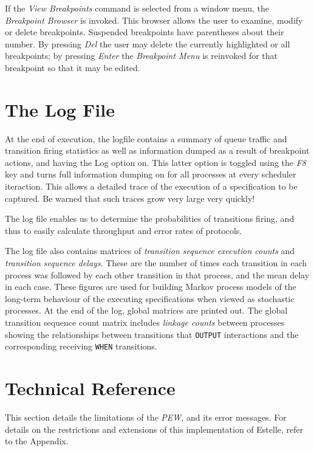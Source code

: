If the {\em View Breakpoints} command is selected from a window menu,
the {\em Breakpoint Browser} is invoked.
This browser allows the user to examine,
modify or delete 
breakpoints. Suspended breakpoints have parentheses about their
number. By pressing {\em Del} the user may delete
the currently highlighted or all breakpoints; by pressing {\em Enter}
the {\em Breakpoint Menu} is reinvoked for that breakpoint so that
it may be edited.

\newpage
\section[The Log File]{The Log File}
\label{logfile}
At the end of execution, the logfile contains a summary of queue
traffic and  transition firing  statistics as well as information
dumped as a result of breakpoint actions, and having the Log option
on. This latter option is toggled using the {\em F8} key and turns
full information dumping on for all processes at every scheduler
iteraction. This allows a detailed trace of the execution of a
specification to be captured. Be warned that such traces grow very
large very quickly!

The log file enables us to
determine the  probabilities of  transitions firing, and thus to
easily calculate throughput and error rates of protocols.

The log file also contains matrices of {\em transition sequence
execution counts} and {\em transition sequence delays}. These are the
number of times each transition in each process was followed by each
other transition in that process, and the mean delay in each case.
These figures are used for building Markov process models of the
long-term behaviour of the executing specifications when viewed as
stochastic processes.
At the end of the log, global matrices are printed out. The global
transition sequence count matrix includes {\em linkage counts}
between processes showing the relationships between transitions that
{\tt OUTPUT} interactions and the corresponding receiving {\tt WHEN}
transitions.

\newpage
\section[Technical Reference]{Technical Reference}

This section details the limitations of the {\em PEW}, and its error
messages. For details on the restrictions and extensions of this
implementation of Estelle, refer to the Appendix.

